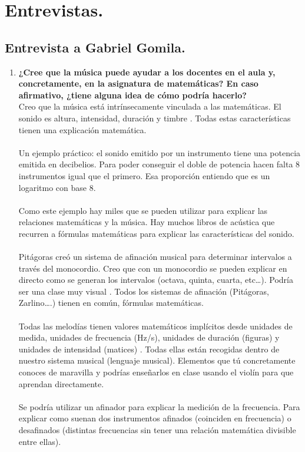 \documentclass[a4paper, openright, 11pt, titlepage]{report}
\theoremstyle{definition}\newtheorem{defin}[propo]{Definition}
\theoremstyle{definition}\newtheorem{obser}[propo]{Remark}
\theoremstyle{definition}\newtheorem{ejem}[propo]{Ejemplo}
\theoremstyle{definition}\newtheorem{algoritmo}[propo]{Algoritmo}
\begin{document}
\chapter{Entrevistas.}
\section{Entrevista a Gabriel Gomila.}
\begin{enumerate}
    \item \textbf{¿Cree que la música puede ayudar a los docentes en el aula y, concretamente, en la asignatura de matemáticas? En caso afirmativo, ¿tiene alguna idea de cómo podría hacerlo?}\\
    Creo que la música está intrínsecamente vinculada a las matemáticas. El sonido es altura, intensidad, duración y timbre . Todas estas características tienen una explicación matemática.\\\\ 
    Un ejemplo práctico: el sonido emitido por un instrumento tiene una potencia emitida en decibelios. Para poder conseguir el doble de potencia hacen falta 8 instrumentos igual que el primero. Esa proporción entiendo que es un logaritmo con base 8.\\\\
    Como este ejemplo hay miles que se pueden utilizar para explicar las relaciones matemáticas y la música. Hay muchos libros de acústica que recurren a fórmulas matemáticas para explicar las características del sonido.\\\\
    Pitágoras creó un sistema de afinación musical para determinar intervalos a través del monocordio. Creo que con un monocordio se pueden explicar en directo como se generan los intervalos (octava, quinta, cuarta, etc…). Podría ser una clase muy visual . 
    Todos los sistemas de afinación (Pitágoras, Zarlino….) tienen en común, fórmulas matemáticas.\\\\
    Todas las melodías tienen valores matemáticos implícitos desde unidades de medida, unidades de frecuencia (Hz/s), unidades de duración (figuras) y unidades de intensidad (matices) . Todas ellas están recogidas dentro de nuestro sistema musical (lenguaje musical). Elementos que tú concretamente conoces de maravilla y podrías enseñarlos en clase usando el violín para que aprendan directamente.\\\\
    Se podría utilizar un afinador para explicar la medición de la frecuencia. Para explicar como suenan dos instrumentos afinados (coinciden en frecuencia) o desafinados (distintas frecuencias sin tener una relación matemática divisible entre ellas).

\end{enumerate}
\end{document}
